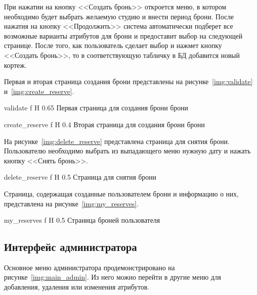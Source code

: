 При нажатии на кнопку <<Создать бронь>> откроется меню, в котором необходимо будет выбрать желаемую студию и внести период брони.
После нажатия на кнопку <<Продолжить>> система автоматически подберет все возможные варианты атрибутов для брони и предоставит выбор на следующей странице.
После того, как пользователь сделает выбор и нажмет кнопку <<Создать бронь>>, то в соответствующую табличку в БД добавится новый кортеж.

Первая и вторая страница создания брони представлены на рисунке~\ref{img:validate} и~\ref{img:create_reserve}.


{validate} %
{f} %
{H} %
{0.65\textwidth} %
{Первая страница для создания брони брони} %




{create_reserve} %
{f} %
{H} %
{0.4\textwidth} %
{Вторая страница для создания брони брони} %


На рисунке~\ref{img:delete_reserve} представлена страница для снятия брони.
Пользователю необходимо выбрать из выпадающего меню нужную дату и нажать кнопку <<Снять бронь>>.



{delete_reserve} %
{f} %
{H} %
{0.5\textwidth} %
{Страница для снятия брони} %


Страница, содержащая созданные пользователем брони и информацию о них, представлена на рисунке~\ref{img:my_reserves}.

{my_reserves} %
{f} %
{H} %
{0.5\textwidth} %
{Страница броней пользователя} %


\subsection{Интерфейс администратора}
Основное меню администратора продемонстрировано на рисунке~\ref{img:main_admin}.
Из него можно перейти в другие меню для добавления, удаления или изменения атрибутов.


